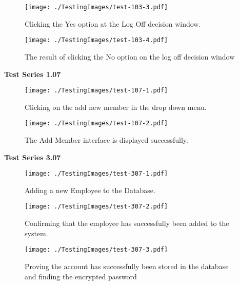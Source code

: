 \begin{figure}[H]
    \texttt{[image: ./TestingImages/test-103-3.pdf]}
    \caption{Clicking the Yes option at the Log Off decision window.} \label{fig:test-103-3}
\end{figure}

\begin{figure}[H]
    \texttt{[image: ./TestingImages/test-103-4.pdf]}
    \caption{The result of clicking the No option on the log off decision window} \label{fig:test-103-4}
\end{figure}


\textbf{Test Series 1.07}

\begin{figure}[H]
    \texttt{[image: ./TestingImages/test-107-1.pdf]}
    \caption{Clicking on the add new member in the drop down menu.} \label{fig:test-107-1}
\end{figure}

\begin{figure}[H]
    \texttt{[image: ./TestingImages/test-107-2.pdf]}
    \caption{The Add Member interface is displayed successfully.} \label{fig:test-107-2}
\end{figure}

\textbf{Test Series 3.07}

\begin{figure}[H]
    \texttt{[image: ./TestingImages/test-307-1.pdf]}
    \caption{Adding a new Employee to the Database.} \label{fig:test-307-1}
\end{figure}

\begin{figure}[H]
    \texttt{[image: ./TestingImages/test-307-2.pdf]}
    \caption{Confirming that the employee has successfully been added to the system.} \label{fig:test-307-2}
\end{figure}

\begin{figure}[H]
    \texttt{[image: ./TestingImages/test-307-3.pdf]}
    \caption{Proving the account has successfully been stored in the database and finding the encrypted password} \label{fig:test-307-3}
\end{figure}

